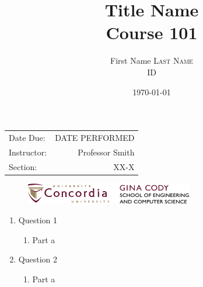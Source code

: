 \documentclass{article}
\title{Title Name \\ Course 101} %
\author{First Name \textsc{Last Name} \\ ID} %
\date{\today} %
\begin{document}
\begin{titlepage}
	\nointerlineskip  %
	\null  %
	\vfill
	\let\snewpage \newpage
	\let\newpage \relax
	\maketitle
	\begin{center}
		\begin{tabular}{l r}
			Date Due: & DATE PERFORMED \\ %
			Instructor: & Professor Smith \\ %
			Section: & XX-X
		\end{tabular}
	\end{center}
	\let \newpage \snewpage
	\vspace{3in}
	\begin{figure}
		\centering
		\includegraphics[width=0.65\textwidth,scale=1.1]{ENCS.jpg} %
	\end{figure}
	\thispagestyle{empty}
\end{titlepage}




\begin{enumerate}
	
	\item Question 1
	\begin{enumerate}
		\item Part a
	\end{enumerate}

	\item Question 2
	\begin{enumerate}
		\item Part a
	\end{enumerate}
	
	
\end{enumerate}
\end{document}
